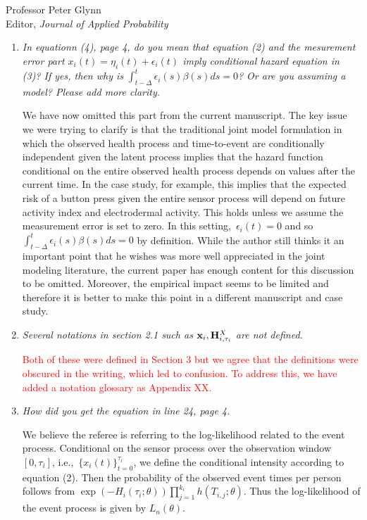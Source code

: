 \documentclass[11pt]{letter} %
\begin{document}
\begin{letter}{Professor
	Peter Glynn\\
	Editor, {\em Journal of Applied Probability}}
\begin{enumerate}
\item {\it In equationn (4), page 4, do you mean that equation (2) and the mesurement error part $x_i (t) = \eta_i (t) + \epsilon_i (t)$ imply conditional hazard equation in (3)?  If yes, then why is $\int_{t-\Delta}^t \epsilon_i (s) \beta(s) ds = 0$?  Or are you assuming a model?  Please add more clarity.}

\vspace{5mm}
We have now omitted this part from the current manuscript. The key issue we were trying to clarify is that the traditional joint model formulation in which the observed health process and time-to-event are conditionally independent given the latent process implies that the hazard function conditional on the entire observed health process depends on values after the current time.  In the case study, for example, this implies that the expected risk of a button press given the entire sensor process will depend on future activity index and electrodermal activity.  This holds unless we assume the measurement error is set to zero.  In this setting,~$\epsilon_i (t) = 0$ and so $\int_{t-\Delta}^t \epsilon_i (s) \beta(s)ds = 0$ by definition. While the author still thinks it an important point that he wishes was more well appreciated in the joint modeling literature, the current paper has enough content for this discussion to be omitted.  Moreover, the empirical impact seems to be limited and therefore it is better to make this point in a different manuscript and case study.
\vspace{5mm}

\item {\it Several notations in section 2.1 such as ${\bf x}_i, {\bf H}_{i,\tau_i}^X$ are not defined.}

\vspace{5mm}
\textcolor{red}{Both of these were defined in Section 3 but we agree that the definitions were obscured in the writing, which led to confusion.  To address this, we have added a notation glossary as Appendix XX.}
\vspace{5mm}

\item {\it How did you get the equation in line 24, page 4.}

\vspace{5mm}
We believe the referee is referring to the log-likelihood related to the event process.   Conditional on the sensor process over the observation window $[0,\tau_i]$, i.e.,~$\{ x_i (t) \}_{t=0}^{\tau_i}$, we define the conditional intensity according to equation (2).  Then the probability of the observed event times per person follows from $\exp \left( - H_i (\tau_i ; \theta) \right) \prod_{j=1}^{k_i} h \left(T_{i,j};\theta \right)$.  Thus the log-likelihood of the event process is given by $L_n (\theta)$.
\vspace{5mm}


\end{enumerate}
\end{letter}
\end{document}
